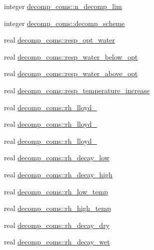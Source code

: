 \begin{DoxyCompactItemize}
\item 
integer \hyperlink{namespacedecomp__coms_acc16e9b621eb378551411054e0eccd19}{decomp\+\_\+coms\+::n\+\_\+decomp\+\_\+lim}
\item 
integer \hyperlink{namespacedecomp__coms_a45f7f700d58a695c51acb5b70ad8df7a}{decomp\+\_\+coms\+::decomp\+\_\+scheme}
\item 
real \hyperlink{namespacedecomp__coms_a742e53482284fcb3d56bad3f0e9a6ce6}{decomp\+\_\+coms\+::resp\+\_\+opt\+\_\+water}
\item 
real \hyperlink{namespacedecomp__coms_ad0a89d5c04a58d5d856f23bf2a6fc673}{decomp\+\_\+coms\+::resp\+\_\+water\+\_\+below\+\_\+opt}
\item 
real \hyperlink{namespacedecomp__coms_ae65f5918ea1fd8476ba6fe08ba75338a}{decomp\+\_\+coms\+::resp\+\_\+water\+\_\+above\+\_\+opt}
\item 
real \hyperlink{namespacedecomp__coms_af7580578ade80e2ff8a83237e4bec847}{decomp\+\_\+coms\+::resp\+\_\+temperature\+\_\+increase}
\item 
real \hyperlink{namespacedecomp__coms_a2775159bda84d12f2b4da2e95e8fb433}{decomp\+\_\+coms\+::rh\+\_\+lloyd\+\_}
\item 
real \hyperlink{namespacedecomp__coms_ac5243babb339349c2d5663277c119dca}{decomp\+\_\+coms\+::rh\+\_\+lloyd\+\_}
\item 
real \hyperlink{namespacedecomp__coms_a73d41d57b6ba219cd24ba95523178524}{decomp\+\_\+coms\+::rh\+\_\+lloyd\+\_}
\item 
real \hyperlink{namespacedecomp__coms_a15da861431aeb575ca7b53fb4ba7972f}{decomp\+\_\+coms\+::rh\+\_\+decay\+\_\+low}
\item 
real \hyperlink{namespacedecomp__coms_a5306d3c9f7c12a69c48bf826d4b7bc31}{decomp\+\_\+coms\+::rh\+\_\+decay\+\_\+high}
\item 
real \hyperlink{namespacedecomp__coms_ac6c93f8adee77514ac222dd1f44f155b}{decomp\+\_\+coms\+::rh\+\_\+low\+\_\+temp}
\item 
real \hyperlink{namespacedecomp__coms_af9b557ce9c8f5946841c90f3c7e34ed9}{decomp\+\_\+coms\+::rh\+\_\+high\+\_\+temp}
\item 
real \hyperlink{namespacedecomp__coms_a861b2bcf03601249e52a185ebd1b8978}{decomp\+\_\+coms\+::rh\+\_\+decay\+\_\+dry}
\item 
real \hyperlink{namespacedecomp__coms_a49939319c35a32768b1106977d01b956}{decomp\+\_\+coms\+::rh\+\_\+decay\+\_\+wet}
\item 

\end{DoxyCompactItemize}
